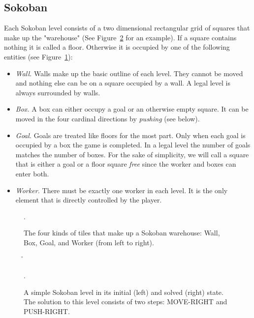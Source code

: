 \documentclass[runningheads]{llncs}
\begin{document}
\subsection{Sokoban}

Each Sokoban level consists of a two dimensional rectangular grid of squares that make
up the "warehouse" (See Figure~\ref{fig-basic-level} for an example). 
If a square contains nothing it is called a floor. Otherwise it is occupied by
one of the following entities (see Figure~\ref{fig-tiles}):

\begin{itemize}
\item \emph{Wall.} Walls make up the basic outline of each level. They cannot be
  moved and nothing else can be on a square occupied by a wall. A legal level is
  always surrounded by walls.

\item \emph{Box.} A box can either occupy a goal or an otherwise empty square. It can be
  moved in the four cardinal directions by \emph{pushing} (see below).

\item  \emph{Goal.} Goals are treated like floors for the most part. Only when
  each goal is occupied by a box the game is completed. In a legal level the
  number of goals matches the number of boxes. For the sake of simplicity, we
  will call a square that is either a goal or a floor square \emph{free} since
  the worker and boxes can enter both.

\item \emph{Worker.} There must be exactly one worker in each level.
  It is the only element that is directly controlled by the player.
\end{itemize}

\begin{figure}
\centering
\w\e\x\e\g\e\p\n
\caption{The four kinds of tiles that make up a Sokoban warehouse: Wall, Box, Goal, and Worker (from left to right).}.
\label{fig-tiles}
\end{figure}


\begin{figure}
\centering
\w\w\w\w\w\w\e\w\w\w\w\w\w\n
\w\p\e\x\g\w\e\w\e\e\p\h\w\n
\w\w\w\w\w\w\e\w\w\w\w\w\w\n
\caption{A simple Sokoban level in its initial (left) and solved (right) state. 
The solution to this level consists of two steps: MOVE-RIGHT and PUSH-RIGHT.}.
\label{fig-basic-level}
\end{figure}
\end{document}
